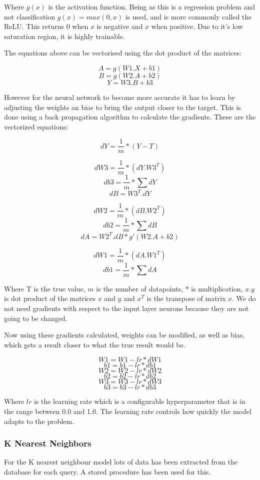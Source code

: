 \documentclass[11pt]{article}
\begin{document}
	Where $g(x)$ is the activation function. Being as this is a regression problem and not classification $g(x) = max(0,x)$ is used, and is more commonly called the ReLU. This returns 0 when $x$ is negative and $x$ when positive. Due to it’s low saturation region, it is highly trainable. 
	
	The equations above can be vectorised using the dot product of the matrices:
	
	\[A = g(W1.X + b1)\]
	\[B = g(W2.A + b2)\]
	\[Y = W3.B + b3\]
	
	However for the neural network to become more accurate it has to learn by adjusting the weights an bias to bring the output closer to the target. This is done using a back propagation algorithm to calculate the gradients. These are the vectorized equations:
	
	\[dY = \frac{1}{m} * (Y-T) \]
	
	\[dW3 = \frac{1}{m} * (dY.W3^T) \]
	\[db3 = \frac{1}{m} * \sum dY \]
	\[dB = W3^T.dY\]
	
	\[dW2 = \frac{1}{m} * (dB.W2^T) \]
	\[db2 = \frac{1}{m} * \sum dB \]
	\[dA = W2^T.dB * g'(W2.A+b2)\]
	
	\[dW1 = \frac{1}{m} * (dA.W1^T) \]
	\[db1 = \frac{1}{m} * \sum dA \]
	
	Where T is the true value, $m$ is the number of datapoints, $*$ is multiplication, $x.y$ is dot product of the matrices $x$ and $y$ and $x^T$ is the transpose of matrix $x$. We do not need gradients with respect to the input layer neurons because they are not going to be changed.

	Now using these gradients calculated, weights can be modified, as well as bias, which gets a result closer to what the true result would be.
	
	\[W1 = W1 - lr * dW1\]
	\[b1 = b1 - lr * db1\]
	\[W2 = W2 - lr * dW2\]
	\[b2 = b2 - lr * db2\]
	\[W3 = W3 - lr * dW3\]
	\[b3 = b3 - lr * db3\]
	
	Where $lr$ is the learning rate which is a configurable hyperparameter that is in the range between 0.0 and 1.0. The learning rate controls how quickly the model adapts to the problem.
	
	\subsubsection{K Nearest Neighbors}		
	
	For the K nearest neighbour model lots of data has been extracted from the database for each query. A stored procedure has been used for this.
	
\end{document}
